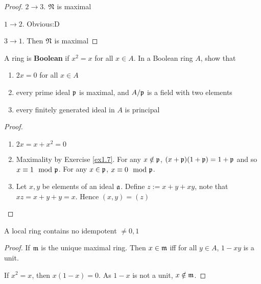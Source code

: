 \documentclass[11pt]{article}
\begin{document}
\begin{proof}
\(2\to 3\). \(\mathfrak{N}\) is maximal

\(1\to 2\). Obvious:D

\(3\to 1\). Then \(\mathfrak{N}\) is maximal
\end{proof}

\begin{exercise}
\label{ex1.11}
A ring is \textbf{Boolean} if \(x^2=x\) for all \(x\in A\). In a Boolean ring \(A\), show that
\begin{enumerate}
\item \(2x=0\) for all \(x\in A\)
\item every prime ideal \(\mathfrak{p}\) is maximal, and \(A/\mathfrak{p}\) is a field with two elements
\item every finitely generated ideal in \(A\) is principal
\end{enumerate}
\end{exercise}

\begin{proof}
\begin{enumerate}
\item \(2x=x+x^2=0\)
\item Maximality by Exercise \ref{ex1.7}. For any \(x\notin\mathfrak{p}\), \((x+\mathfrak{p})(1+\mathfrak{p})=1+\mathfrak{p}\) and so \(x\equiv 1\mod{\mathfrak{p}}\).
For any \(x\in\mathfrak{p}\), \(x\equiv 0\mod{\mathfrak{p}}\).
\item Let \(x,y\) be elements of an ideal \(\mathfrak{a}\). Define \(z:=x+y+xy\), note that \(xz=x+y+y=x\).
Hence \((x,y)=(z)\)
\end{enumerate}
\end{proof}

\begin{exercise}
\label{ex1.12}
A local ring contains no idempotent \(\neq 0,1\)
\end{exercise}

\begin{proof}
If \(\mathfrak{m}\) is the unique maximal ring. Then \(x\in\mathfrak{m}\) iff for all \(y\in A\), \(1-xy\) is a unit.

If \(x^2=x\), then \(x(1-x)=0\). As \(1-x\) is not a unit, \(x\notin\mathfrak{m}\).
\end{proof}
\end{document}
